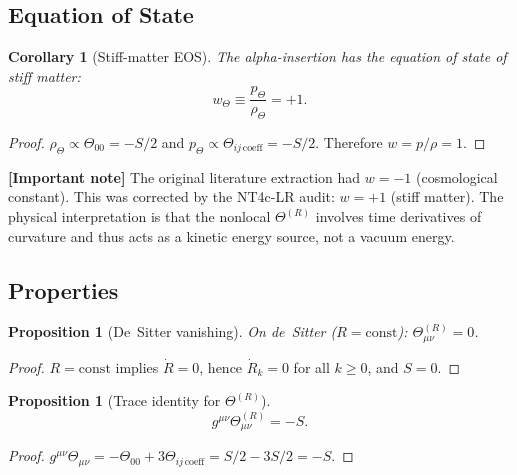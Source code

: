 \documentclass[11pt,a4paper]{article}
\theoremstyle{plain}
\newtheorem{proposition}[theorem]{Proposition}
\newtheorem{corollary}[theorem]{Corollary}
\theoremstyle{definition}
\newcommand{\signcorrection}[1]{%
  \par\smallskip\noindent
  \colorbox{red!10}{\parbox{\dimexpr\linewidth-2\fboxsep}{%
    \textcolor{red!60!black}{\textbf{[Important note]}} #1}}%
  \par\smallskip}
\begin{document}
\subsection{Equation of State}

\begin{corollary}[Stiff-matter EOS]\label{cor:eos}
The alpha-insertion has the equation of state of stiff matter:
\begin{equation}\label{eq:eos}
  w_\Theta \equiv \frac{p_\Theta}{\rho_\Theta} = +1.
\end{equation}
\end{corollary}

\begin{proof}
$\rho_\Theta \propto \Theta_{00} = -S/2$ and
$p_\Theta \propto \Theta_{ij\,\text{coeff}} = -S/2$.
Therefore $w = p/\rho = 1$.
\end{proof}

\signcorrection{The original literature extraction had $w = -1$
(cosmological constant). This was corrected by the NT4c-LR audit:
$w = +1$ (stiff matter). The physical interpretation is that
the nonlocal $\Theta^{(R)}$ involves time derivatives of curvature
and thus acts as a kinetic energy source, not a vacuum energy.}

\subsection{Properties}

\begin{proposition}[De~Sitter vanishing]\label{prop:theta-dS}
On de~Sitter ($R = \mathrm{const}$): $\Theta^{(R)}_{\mu\nu} = 0$.
\end{proposition}

\begin{proof}
$R = \text{const}$ implies $\dot{R} = 0$, hence $\dot{R}_k = 0$
for all $k \geq 0$, and $S = 0$.
\end{proof}

\begin{proposition}[Trace identity for $\Theta^{(R)}$]\label{prop:theta-trace}
\begin{equation}\label{eq:theta-trace}
  g^{\mu\nu}\Theta^{(R)}_{\mu\nu} = -S.
\end{equation}
\end{proposition}

\begin{proof}
$g^{\mu\nu}\Theta_{\mu\nu} = -\Theta_{00} + 3\Theta_{ij\,\text{coeff}}
= S/2 - 3S/2 = -S$.
\end{proof}
\end{document}
